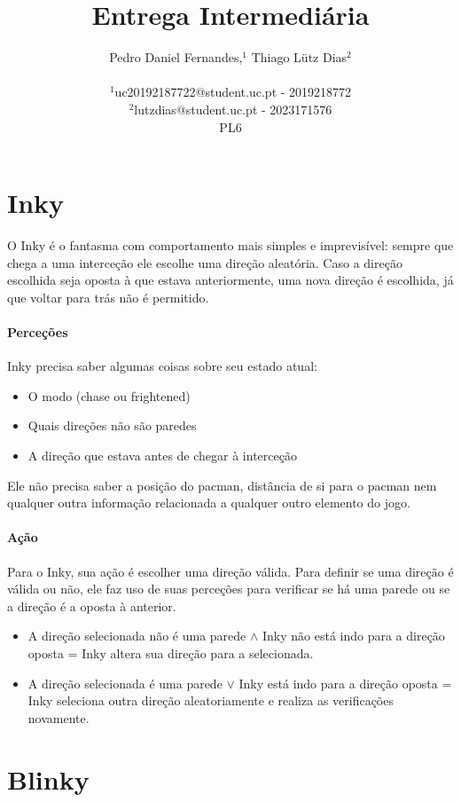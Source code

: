 \documentclass[12pt]{article}
\title{Entrega Intermediária}
\author{
Pedro Daniel Fernandes,$^{1}$ Thiago Lütz Dias$^{2}$\\
\\
\normalsize{$^{1}$uc20192187722@student.uc.pt - 2019218772}\\
\normalsize{$^{2}$lutzdias@student.uc.pt - 2023171576}\\
\small{PL6}\\
}
\date{}
\begin{document}
 

\maketitle 

\section*{Inky}

O Inky é o fantasma com comportamento mais simples e imprevisível: sempre que
chega a uma interceção ele escolhe uma direção aleatória. Caso a direção
escolhida seja oposta à que estava anteriormente, uma nova direção é escolhida, já que voltar para trás não é permitido.

\paragraph*{Perceções}
Inky precisa saber algumas coisas sobre seu estado atual:
\begin{itemize}
    \item O modo (chase ou frightened)
    \item Quais direções não são paredes
    \item A direção que estava antes de chegar à interceção
\end{itemize}

Ele não precisa saber a posição do pacman, distância de si para o pacman nem
qualquer outra informação relacionada a qualquer outro elemento do jogo.

\paragraph*{Ação} 
Para o Inky, sua ação é escolher uma direção válida. Para definir se uma direção é válida ou não, ele faz uso de suas perceções para verificar se há uma parede ou se a direção é a oposta à anterior.
\begin{itemize}
    \item A direção selecionada não é uma parede $\land$ Inky não está indo para a direção oposta = Inky altera sua direção para a selecionada.

    \item A direção selecionada é uma parede $\lor$ Inky está indo para a direção oposta = Inky seleciona outra direção aleatoriamente e realiza as verificações novamente.
\end{itemize}

\section*{Blinky}
\end{document}
